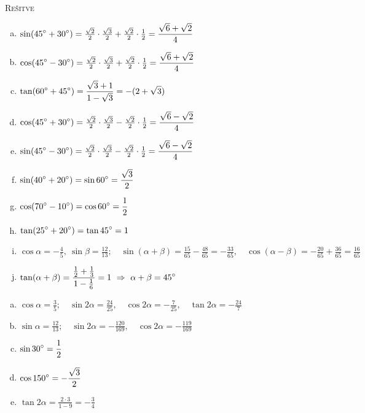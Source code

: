 \documentclass[a4paper,12pt]{letter}
\begin{document}

\newpage
\textsc{\Large Re\v{s}itve}
\vspace{0.5cm}

\begin{resitev}
\begin{enumerate}[a)]
\item $\displaystyle \sin(45\degree+30\degree)=\tfrac{\sqrt2}{2}\cdot\tfrac{\sqrt3}{2}+\tfrac{\sqrt2}{2}\cdot\tfrac12=\frac{\sqrt6+\sqrt2}{4}$
\item $\displaystyle \cos(45\degree-30\degree)=\tfrac{\sqrt2}{2}\cdot\tfrac{\sqrt3}{2}+\tfrac{\sqrt2}{2}\cdot\tfrac12=\frac{\sqrt6+\sqrt2}{4}$
\item $\displaystyle \tan(60\degree+45\degree)=\frac{\sqrt3+1}{1-\sqrt3}=-(2+\sqrt3)$
\item $\displaystyle \cos(45\degree+30\degree)=\tfrac{\sqrt2}{2}\cdot\tfrac{\sqrt3}{2}-\tfrac{\sqrt2}{2}\cdot\tfrac12=\frac{\sqrt6-\sqrt2}{4}$
\item $\displaystyle \sin(45\degree-30\degree)=\tfrac{\sqrt2}{2}\cdot\tfrac{\sqrt3}{2}-\tfrac{\sqrt2}{2}\cdot\tfrac12=\frac{\sqrt6-\sqrt2}{4}$
\item $\displaystyle \sin(40\degree+20\degree)=\sin60\degree=\frac{\sqrt3}{2}$
\item $\displaystyle \cos(70\degree-10\degree)=\cos60\degree=\frac12$
\item $\displaystyle \tan(25\degree+20\degree)=\tan45\degree=1$
\item $\displaystyle \cos\alpha=-\tfrac45,\ \sin\beta=\tfrac{12}{13};\quad \sin(\alpha+\beta)=\tfrac{15}{65}-\tfrac{48}{65}=-\frac{33}{65},\quad \cos(\alpha-\beta)=-\tfrac{20}{65}+\tfrac{36}{65}=\frac{16}{65}$
\item $\displaystyle \tan(\alpha+\beta)=\frac{\frac12+\frac13}{1-\frac16}=1\ \Rightarrow\ \alpha+\beta=45\degree$
\end{enumerate}
\end{resitev}

\begin{resitev}
\begin{enumerate}[a)]
\item $\displaystyle \cos\alpha=\tfrac35;\quad \sin2\alpha=\frac{24}{25},\quad \cos2\alpha=-\frac{7}{25},\quad \tan2\alpha=-\frac{24}{7}$
\item $\displaystyle \sin\alpha=\tfrac{12}{13};\quad \sin2\alpha=-\frac{120}{169},\quad \cos2\alpha=-\frac{119}{169}$
\item $\displaystyle \sin30\degree=\frac12$
\item $\displaystyle \cos150\degree=-\frac{\sqrt3}{2}$
\item $\displaystyle \tan2\alpha=\frac{2\cdot3}{1-9}=-\frac34$
\end{enumerate}
\end{resitev}
\end{document}
